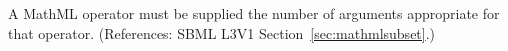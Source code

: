 A MathML operator must be supplied the number of arguments appropriate for
that operator.  (References: SBML L3V1 Section~\ref{sec:mathmlsubset}.)
